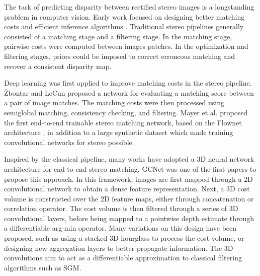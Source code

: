 \documentclass[10pt,twocolumn,letterpaper]{article}
\begin{document}
The task of predicting disparity between rectified stereo images is a longstanding problem in computer vision. Early work focused on designing better matching costs \cite{hannah1974computer,zabih1994non} and efficient inference algorithms \cite{kolmogorov2006convergent,semiglobalmatching,barnes2009patchmatch}. Traditional stereo pipelines generally consisted of a matching stage and a filtering stage. In the matching stage, pairwise costs were computed between images patches. In the optimization and filtering stages, priors could be imposed to correct erroneous matching and recover a consistent disparity map.

Deep learning was first applied to improve matching costs in the stereo pipeline. \v{Z}bontar and LeCun \cite{zbontar2015computing} proposed a network for evaluating a matching score between a pair of image matches. The matching costs were then processed using semiglobal matching, consistency checking, and filtering. Mayer et al. \cite{sceneflow} proposed the first end-to-end trainable stereo matching network, based on the Flownet architecture \cite{dosovitskiy2015flownet}, in addition to a large synthetic dataset which made training convolutional networks for stereo possible.

Inspired by the classical pipeline, many works have adopted a 3D neural network architecture for end-to-end stereo matching\cite{mvnsnet,psmnet,gcnet,gwcnet,ganet,dsmnet}. GCNet\cite{gcnet} was one of the first papers to propose this approach. In this framework, images are first mapped through a 2D convolutional network to obtain a dense feature representation. Next, a 3D cost volume is constructed over the 2D feature maps, either through concatenation\cite{gcnet} or correlation operator\cite{gwcnet}. The cost volume is then filtered through a series of 3D convolutional layers, before being mapped to a pointwise depth estimate through a differentiable arg-min operator. Many variations on this design have been proposed, such as using a stacked 3D hourglass to process the cost volume\cite{psmnet}, or designing new aggregation layers to better propagate information\cite{ganet}. The 3D convolutions aim to act as a differentiable approximation to classical filtering algorithms such as SGM\cite{semiglobalmatching}. 
\end{document}
